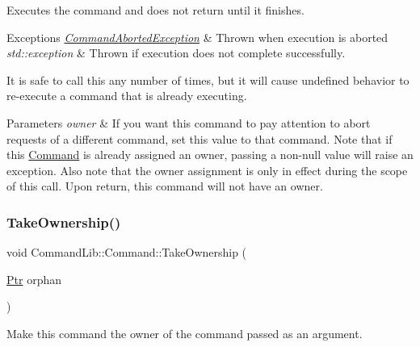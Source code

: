 Executes the command and does not return until it finishes.


\begin{DoxyExceptions}{Exceptions}
{\em \mbox{\hyperlink{class_command_lib_1_1_command_aborted_exception}{Command\+Aborted\+Exception}}} & Thrown when execution is aborted\\
\hline
{\em std\+::exception} & Thrown if execution does not complete successfully. \\
\hline
\end{DoxyExceptions}


It is safe to call this any number of times, but it will cause undefined behavior to re-\/execute a command that is already executing. 


\begin{DoxyParams}{Parameters}
{\em owner} & If you want this command to pay attention to abort requests of a different command, set this value to that command. Note that if this \mbox{\hyperlink{class_command_lib_1_1_command}{Command}} is already assigned an owner, passing a non-\/null value will raise an exception. Also note that the owner assignment is only in effect during the scope of this call. Upon return, this command will not have an owner. \\
\hline
\end{DoxyParams}
\mbox{\label{class_command_lib_1_1_command_a0787e7b79c5424926be5c1c8be1ebb0d}} 
\subsubsection{\texorpdfstring{Take\+Ownership()}{TakeOwnership()}}
{\footnotesize\ttfamily void Command\+Lib\+::\+Command\+::\+Take\+Ownership (\begin{DoxyParamCaption}\item[{\mbox{\hyperlink{class_command_lib_1_1_command_a3b3e4f00144373299df5c6bb1acc319d}{Ptr}}}]{orphan }\end{DoxyParamCaption})\hspace{0.3cm}{\ttfamily [protected]}}



Make this command the owner of the command passed as an argument.


